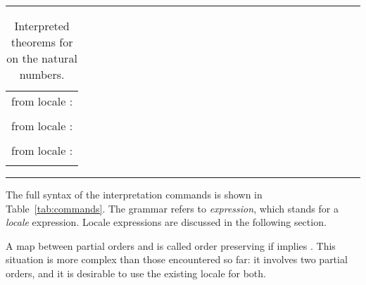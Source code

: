 \begin{isabellebody}
\begin{isamarkuptext}
\begin{table}
\hrule
\vspace{2ex}
\begin{center}
\begin{tabular}{l}
  \isa{nat{\isacharunderscore}dvd{\isachardot}less{\isacharunderscore}def} from locale \isa{partial{\isacharunderscore}order}: \\
  \quad \isa{{\isacharparenleft}{\isacharquery}x\ dvd\ {\isacharquery}y\ {\isasymand}\ {\isacharquery}x\ {\isasymnoteq}\ {\isacharquery}y{\isacharparenright}\ {\isacharequal}\ {\isacharparenleft}{\isacharquery}x\ dvd\ {\isacharquery}y\ {\isasymand}\ {\isacharquery}x\ {\isasymnoteq}\ {\isacharquery}y{\isacharparenright}} \\
  \isa{nat{\isacharunderscore}dvd{\isachardot}meet{\isacharunderscore}left} from locale \isa{lattice}: \\
  \quad \isa{gcd\ {\isacharquery}x\ {\isacharquery}y\ dvd\ {\isacharquery}x} \\
  \isa{nat{\isacharunderscore}dvd{\isachardot}join{\isacharunderscore}distr} from locale \isa{distrib{\isacharunderscore}lattice}: \\
  \quad \isa{lattice{\isachardot}join\ op\ dvd\ {\isacharquery}x\ {\isacharparenleft}lattice{\isachardot}meet\ op\ dvd\ {\isacharquery}y\ {\isacharquery}z{\isacharparenright}\ {\isacharequal}\ lattice{\isachardot}meet\ op\ dvd\ {\isacharparenleft}lattice{\isachardot}join\ op\ dvd\ {\isacharquery}x\ {\isacharquery}y{\isacharparenright}\ {\isacharparenleft}lattice{\isachardot}join\ op\ dvd\ {\isacharquery}x\ {\isacharquery}z{\isacharparenright}} \\
\end{tabular}
\end{center}
\hrule
\caption{Interpreted theorems for  on the natural numbers.}
\label{tab:nat-dvd-lattice}
\end{table}%
\end{isamarkuptext}%
\isamarkuptrue%
%
\begin{isamarkuptext}%
The full syntax of the interpretation commands is shown in
  Table~\ref{tab:commands}.  The grammar refers to
  \textit{expression}, which stands for a \emph{locale} expression.
  Locale expressions are discussed in the following section.%
\end{isamarkuptext}%
\isamarkuptrue%
%
\isamarkuptrue%
%
\begin{isamarkuptext}%
A map \isa{{\isasymphi}} between partial orders \isa{{\isasymsqsubseteq}} and \isa{{\isasympreceq}}
  is called order preserving if  implies .  This situation is more complex than those encountered so
  far: it involves two partial orders, and it is desirable to use the
  existing locale for both.


\end{isamarkuptext}
\end{isabellebody}
